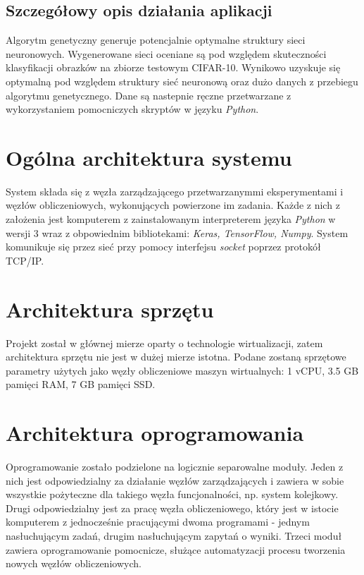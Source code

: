 \subsection{Szczegółowy opis działania aplikacji}
Algorytm genetyczny generuje potencjalnie optymalne struktury sieci neuronowych.
Wygenerowane sieci oceniane są pod względem skuteczności klasyfikacji obrazków na zbiorze testowym CIFAR-10.
Wynikowo uzyskuje się optymalną pod względem struktury sieć neuronową oraz dużo danych z przebiegu algorytmu genetycznego.
Dane są nastepnie ręczne przetwarzane z wykorzystaniem pomocniczych skryptów w języku \textit{Python}.

\section{Ogólna architektura systemu}
System składa się z węzła zarządzającego przetwarzanymmi eksperymentami i węzłów obliczeniowych, wykonujących powierzone im zadania.
Każde z nich z założenia jest komputerem z zainstalowanym interpreterem języka \textit{Python} w wersji 3 wraz z obpowiednim bibliotekami: \textit{Keras, TensorFlow, Numpy}.
System komunikuje się przez sieć przy pomocy interfejsu \textit{socket} poprzez protokół TCP/IP.

\section{Architektura sprzętu}

Projekt został w głównej mierze oparty o technologie wirtualizacji, zatem architektura sprzętu nie jest w dużej mierze istotna.
Podane zostaną sprzętowe parametry użytych jako węzły obliczeniowe maszyn wirtualnych: 1 vCPU, 3.5 GB pamięci RAM, 7 GB pamięci SSD.

\section{Architektura oprogramowania}
Oprogramowanie zostało podzielone na logicznie separowalne moduły.
Jeden z nich jest odpowiedzialny za działanie węzłów zarządzających i zawiera w sobie wszystkie pożyteczne dla takiego węzła funcjonalności, np. system kolejkowy.
Drugi odpowiedzialny jest za pracę węzła obliczeniowego, który jest w istocie komputerem z jednocześnie pracującymi dwoma programami - jednym nasłuchującym zadań, drugim nasłuchującym zapytań o wyniki.
Trzeci moduł zawiera oprogramowanie pomocnicze, służące automatyzacji procesu tworzenia nowych węzłów obliczeniowych.

